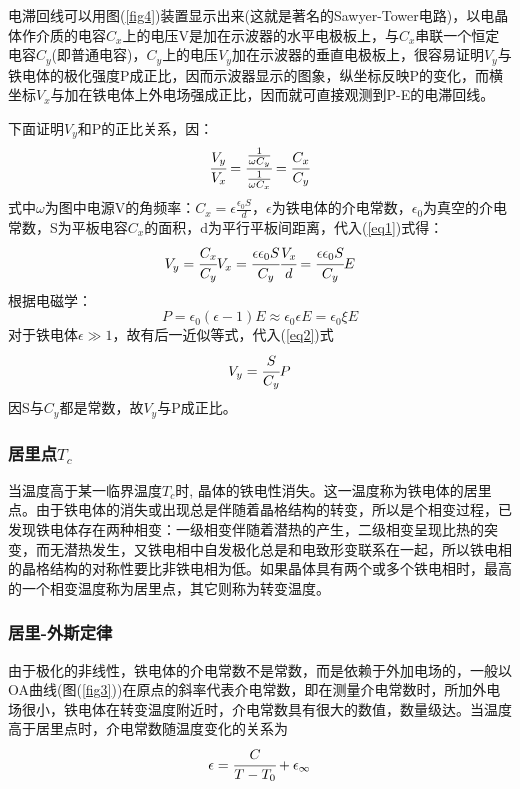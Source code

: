 \documentclass[a4paper]{article}
\begin{document}
电滞回线可以用图(\ref{fig4})装置显示出来(这就是著名的Sawyer-Tower电路)，以电晶体作介质的电容$C_x$上的电压V是加在示波器的水平电极板上，与$C_x$串联一个恒定电容$C_y$(即普通电容)，$C_y$上的电压$V_y$加在示波器的垂直电极板上，很容易证明$V_y$与铁电体的极化强度P成正比，因而示波器显示的图象，纵坐标反映P的变化，而横坐标$V_x$与加在铁电体上外电场强成正比，因而就可直接观测到P-E的电滞回线。

下面证明$V_y$和P的正比关系，因：
\begin{equation}
    \cfrac{V_y}{V_x} = \cfrac{\frac{1}{\omega C_y}}{\frac{1}{\omega C_x}} = \cfrac{C_x}{C_y}\label{eq1}
\end{equation}
式中$\omega$为图中电源V的角频率：$C_x = \epsilon\frac{\epsilon_0S}{d}$，$\epsilon$为铁电体的介电常数，$\epsilon_0$为真空的介电常数，S为平板电容$C_x$的面积，d为平行平板间距离，代入(\ref{eq1})式得：
\begin{equation}
    V_y = \cfrac{C_x}{C_y}V_x = \cfrac{\epsilon\epsilon_0S}{C_y}\cfrac{V_x}{d} = \cfrac{\epsilon\epsilon_0S}{C_y}E\label{eq2}
\end{equation}
根据电磁学：
\begin{equation}
    P = \epsilon_0(\epsilon - 1)E \approx \epsilon_0\epsilon E = \epsilon_0\xi E\label{eq3}
\end{equation}
对于铁电体$\epsilon\gg 1$，故有后一近似等式，代入(\ref{eq2})式
\begin{equation}
    V_y = \cfrac{S}{C_y}P\label{eq4}
\end{equation}
因S与$C_y$都是常数，故$V_y$与P成正比。
\subsubsection{居里点$T_c$}
当温度高于某一临界温度$T_c$时, 晶体的铁电性消失。这一温度称为铁电体的居里点。由于铁电体的消失或出现总是伴随着晶格结构的转变，所以是个相变过程，已发现铁电体存在两种相变：一级相变伴随着潜热的产生，二级相变呈现比热的突变，而无潜热发生，又铁电相中自发极化总是和电致形变联系在一起，所以铁电相的晶格结构的对称性要比非铁电相为低。如果晶体具有两个或多个铁电相时，最高的一个相变温度称为居里点，其它则称为转变温度。
\subsubsection{居里-外斯定律}
由于极化的非线性，铁电体的介电常数不是常数，而是依赖于外加电场的，一般以OA曲线(图(\ref{fig3}))在原点的斜率代表介电常数，即在测量介电常数时，所加外电场很小，铁电体在转变温度附近时，介电常数具有很大的数值，数量级达。当温度高于居里点时，介电常数随温度变化的关系为
\begin{equation}
    \epsilon = \cfrac{C}{T - T_0}+\epsilon_{\infty}\label{eq5}
\end{equation}
\end{document}
